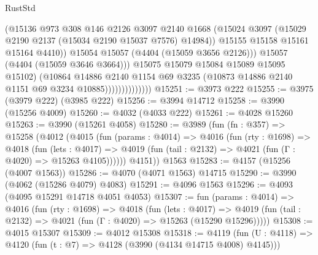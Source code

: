 \begin{lexlean}{RustStd}
\begin{coremodule}
{\begin{coremodule}
{{{{{{{{{{{{{{{{                                    (@15136
                                      @973
                                      @308
                                      @146
                                      @2126
                                      @3097
                                      @2140
                                      @1668
                                      (@15024
                                        @3097
                                        (@15029 @2190 @2137 (@15034 @2190 @15037 @7576) @14984))
                                      @15155
                                      @15158
                                      @15161
                                      @15164
                                      @4410))
                                  @15054
                                  @15057
                                  (@4404 (@15059 @3656 @2126)))
                                @15057
                                (@4404 (@15059 @3646 @3664)))
                              @15075
                              @15079
                              @15084
                              @15089
                              @15095
                              @15102)
                            (@10864
                              @14886
                              @2140
                              @1154
                              @69
                              @3235
                              (@10873 @14886 @2140 @1151 @69 @3234 @10885))))))))))))))
@15251 := @3973 @222
@15255 := @3975 (@3979 @222) (@3985 @222)
@15256 := @3994 @14712
@15258 := @3990 (@15256 @4009)
@15260 := @4032 (@4033 @222)
@15261 := @4028 @15260
@15263 := @3990 (@15261 @4058)
@15280 := @3989
    (fun (fn : @357) =>
    @15258
      (@4012
        (@4015
          (fun (params : @4014) =>
          @4016
            (fun (rty : @1698) =>
            @4018
              (fun (lets : @4017) =>
              @4019 (fun (tail : @2132) => @4021 (fun (Γ : @4020) => @15263 @4105))))))
        @4151))
    @1563
@15283 := @4157 (@15256 (@4007 @1563))
@15286 := @4070 (@4071 @1563) @14715
@15290 := @3990 (@4062 (@15286 @4079) @4083)
@15291 := @4096 @1563
@15296 := @4093 (@4095 @15291 @14718 @4051 @4053)
@15307 := fun (params : @4014) =>
  @4016
    (fun (rty : @1698) =>
    @4018
      (fun (lets : @4017) =>
      @4019 (fun (tail : @2132) => @4021 (fun (Γ : @4020) => @15263 (@15290 @15296)))))
@15308 := @4015 @15307
@15309 := @4012 @15308
@15318 := @4119
    (fun (U : @4118) => @4120 (fun (t : @7) => @4128 (@3990 (@4134 @14715 @4008) @4145)))
}}}}}}}}}}}}}}}}
\end{coremodule}}
\end{coremodule}
\end{lexlean}
